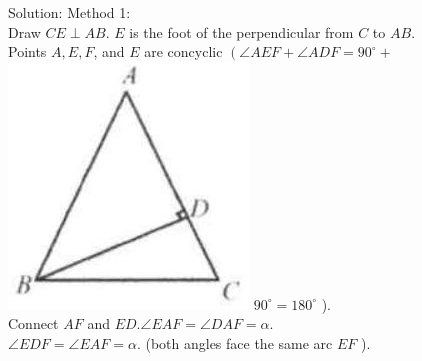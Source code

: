 \documentclass[10pt]{article}
\begin{document}
Solution:
Method 1:\\
Draw \(C E \perp A B\). \(E\) is the foot of the perpendicular from \(C\) to \(A B\).\\
Points \(A, E, F\), and \(E\) are concyclic \(\left(\angle A E F+\angle A D F=90^{\circ}+\right.\)\\
\includegraphics[max width=\textwidth]{2025_04_17_97bc1f7e44d93c271a88g-194(2)} \(90^{\circ}=180^{\circ}\) ).\\
Connect \(A F\) and \(E D . \angle E A F=\angle D A F=\alpha\).\\
\(\angle E D F=\angle E A F=\alpha\). (both angles face the same arc \(E F\) ).
\end{document}
